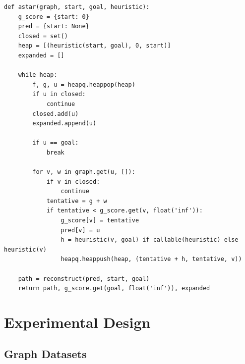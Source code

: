 \documentclass[12pt, a4paper, oneside]{report}
\theoremstyle{definition}
\begin{document}
\begin{lstlisting}[caption={A* algorithm with pluggable heuristic (from core.algorithms)}, label={lst:astar}]
def astar(graph, start, goal, heuristic):
    g_score = {start: 0}
    pred = {start: None}
    closed = set()
    heap = [(heuristic(start, goal), 0, start)]
    expanded = []
    
    while heap:
        f, g, u = heapq.heappop(heap)
        if u in closed: 
            continue
        closed.add(u)
        expanded.append(u)
        
        if u == goal: 
            break
            
        for v, w in graph.get(u, []):
            if v in closed: 
                continue
            tentative = g + w
            if tentative < g_score.get(v, float('inf')):
                g_score[v] = tentative
                pred[v] = u
                h = heuristic(v, goal) if callable(heuristic) else heuristic(v)
                heapq.heappush(heap, (tentative + h, tentative, v))
                
    path = reconstruct(pred, start, goal)
    return path, g_score.get(goal, float('inf')), expanded
\end{lstlisting}

\section{Experimental Design}

\subsection{Graph Datasets}

\begin{table}[H]
\centering
\caption{Experimental Graph Datasets}
\label{tab:datasets}
\end{table}
\end{document}
